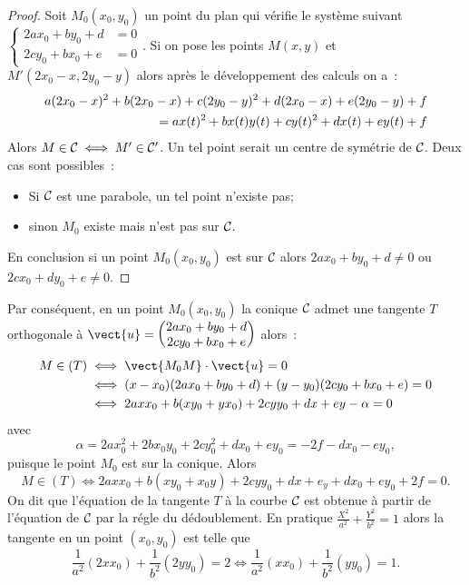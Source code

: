 \begin{proof}
  Soit $M_0(x_0,y_0)$ un point du plan qui vérifie le système suivant $\begin{cases}2ax_0+by_0+d &=0 \\ 2cy_0+bx_0+e &=0\end{cases}$. Si on pose les points $M(x,y)$ et $M'(2x_0-x,2y_0-y)$ alors après le développement des calculs on a~:
  \begin{align}
    a(2x_0-x)^2+b(2x_0-x)+c(2y_0-y)^2+d(2x_0-x)+e(2y_0-y)+f \notag \\
= ax(t)^2+bx(t)y(t)+cy(t)^2+dx(t)+ey(t)+f
  \end{align}
Alors $M \in \mathcal{C}_{} \iff M' \in \mathcal{C}_{}'$. Un tel point serait un centre de symétrie de $\mathcal{C}_{}$. Deux cas sont possibles~:
\begin{itemize}
\item Si $\mathcal{C}_{}$ est une parabole, un tel point n'existe pas;
\item sinon $M_0$ existe mais n'est pas sur $\mathcal{C}_{}$.
\end{itemize}
En conclusion si un point $M_0(x_0,y_0)$ est sur $\mathcal{C}_{}$ alors $2ax_0+by_0+d \neq 0$ ou $2cx_0+dy_0+e \neq 0$.
\end{proof}
Par conséquent, en un point $M_0(x_0,y_0)$ la conique $\mathcal{C}_{}$ admet une tangente $T$ orthogonale à $\vect{u}=\begin{pmatrix} 2ax_0 +by_0 +d \\ 2cy_0+bx_0+e \end{pmatrix}$  alors~:
\begin{align}
M \in (T) &\iff \vect{M_0 M} \cdot \vect{u}=0 \\
&\iff (x-x_0)(2ax_0+by_0+d)+(y-y_0)(2cy_0+bx_0+e)=0 \\
&\iff 2axx_0 + b(xy_0+yx_0)+2cyy_0 +dx+ey - \alpha=0
\end{align}
avec 
\begin{equation}
\alpha=2ax_0^2+  2bx_0y_0+2cy_0^2+dx_0+ey_0=-2f-dx_0-ey_0,
\end{equation}
puisque le point $M_0$ est sur la conique. Alors
\begin{equation}
  M \in (T) \iff 2axx_0+b(xy_0+x_0y)+2cyy_0+dx+e_y+dx_0+ey_0+2f=0.
\end{equation}
On dit que l'équation de la tangente $T$ à la courbe $\mathcal{C}_{}$ est obtenue à partir de l'équation de $\mathcal{C}_{}$ par la régle du dédoublement. En pratique $\frac{X^2}{a^2} + \frac{Y^2}{b^2}=1$ alors la tangente en un point $(x_0,y_0)$ est telle que
\begin{equation}
  \frac{1}{a^2}(2xx_0) + \frac{1}{b^2}(2yy_0)=2 \iff \frac{1}{a^2}(xx_0) + \frac{1}{b^2}(yy_0)=1.
\end{equation}

